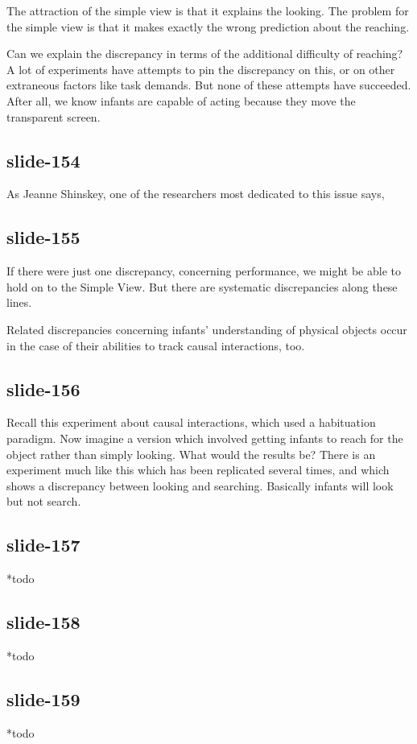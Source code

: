 \documentclass[12pt,\papersize]{extarticle}
\begin{document}
The attraction of the simple view is that it explains the looking.
The problem for the simple view is that it makes exactly the wrong prediction about the reaching.
 
Can we explain the discrepancy in terms of the additional difficulty of reaching?
A lot of experiments have attempts to pin the discrepancy on this, or on other extraneous factors like task demands.
But none of these attempts have succeeded.
After all, we know infants are capable of acting because they move the transparent screen.
 
\subsection{slide-154}
As Jeanne Shinskey, one of the researchers most dedicated to this issue says,
 
\subsection{slide-155}
If there were just one discrepancy, concerning performance, we might be able to hold on to the
Simple View.  But there are systematic discrepancies along these lines.
 
Related discrepancies concerning infants' understanding of physical objects occur in the case
of their abilities to track causal interactions, too.
 
\subsection{slide-156}
Recall this experiment about causal interactions, which used a habituation paradigm.
Now imagine a version which involved getting infants to reach for the object rather than simply looking.
What would the results be?
There is an experiment much like this which has been replicated several times, and which shows 
a discrepancy between looking and searching.
Basically infants will look but not search.
 
\subsection{slide-157}
*todo
 
\subsection{slide-158}
*todo
 
\subsection{slide-159}
*todo
 
\end{document}
